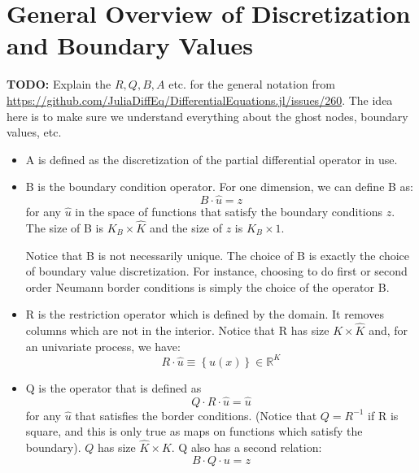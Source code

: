 \documentclass[11pt]{article}
\newcommand{\set}[1]{\ensuremath{\left\{{#1}\right\}}}
\newcommand{\R}{\ensuremath{\mathbb{R}}}
\begin{document}
	\section{General Overview of Discretization and Boundary Values}\label{sec:general}
	\textbf{TODO:} Explain the $R, Q, B, A$ etc. for the general notation from \url{https://github.com/JuliaDiffEq/DifferentialEquations.jl/issues/260}.  The idea here is to make sure we understand everything about the ghost nodes, boundary values, etc.
	\begin{itemize}
		\item A is defined as the discretization of the partial differential operator in use.
		
		\item B is the boundary condition operator. For one dimension, we can define B as:
		\begin{equation}
		B\cdot \hat{u} = z
		\label{B_operator_block}
		\end{equation}
		for any $\hat{u}$ in the space of functions that satisfy the boundary conditions $z$. The size of B is $K_{B} \times \hat{K}$ and the size of $z$ is $K_{B} \times 1$.
		
		Notice that B is not necessarily unique. The choice of B is exactly the choice of boundary value discretization. For instance, choosing to do first or second order Neumann border conditions is simply the choice of the operator B.
		
		\item R is the restriction operator which is defined by the domain. It removes columns which are not in the interior. Notice that R has size $K \times \hat{K}$ and, for an univariate process, we have:
		\begin{equation}
		R\cdot \hat{u}  \equiv\set{u(x)} \in \R^{K} \label{R_operator}
		\end{equation}
		
		\item Q is the operator that is defined as
		\begin{equation}
		Q \cdot R\cdot\hat{u} = \hat{u}\label{Q_operator_1}
		\end{equation}
		for any $\hat{u}$ that satisfies the border conditions. (Notice that $Q = R^{-1}$ if R is square, and this is only true as maps on functions which satisfy the boundary). $Q$ has size $\hat{K} \times K$.
		Q also has a second relation: 
		\begin{equation}
		B\cdot Q\cdot u  = z
		\label{Q_operator_2}
		\end{equation}
		

\end{itemize}
\end{document}
